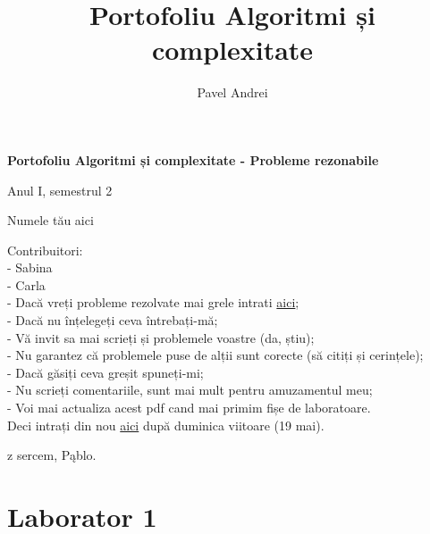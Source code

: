 \documentclass[11pt]{article}
\author{Pavel Andrei}
\date{}
\title{Portofoliu Algoritmi și complexitate}
\begin{document}
\begin{titlepage}
    \begin{center}
        \vspace*{3cm}
 
 
        \Huge
        \textbf{Portofoliu Algoritmi și complexitate - Probleme rezonabile}

        \vspace{0.5cm}
        \LARGE
        Anul I, semestrul 2

        \vspace{2cm}
        \Large
        {Numele tău aici}\\
        \vspace{2cm}
 
 
    \end{center}
    \Large
        Contribuitori:\\
        - Sabina \\
        - Carla \\
        

        \vspace{2cm}
        \Large
        \noindent
        - Dacă vreți probleme rezolvate mai grele intrati \href{https://github.com/azbyn/fundamentele/blob/master/portofoliu.pdf}{aici};\\
        - Dacă nu înțelegeți ceva întrebați-mă;\\
        - Vă invit sa mai scrieți și problemele voastre (da, știu);\\
        - Nu garantez că problemele puse de alții sunt corecte (să citiți și cerințele);\\
        - Dacă găsiți ceva greșit spuneți-mi;\\
        - Nu scrieți comentariile, sunt mai mult pentru amuzamentul meu;\\
        - Voi mai actualiza acest pdf cand mai primim fișe de laboratoare.\\ Deci intrați din nou \href{https://github.com/azbyn/fundamentele/blob/master/portofoliu_simple.pdf}{aici} după duminica viitoare (19 mai).
    
    \begin{center}
        \vfill
        z sercem, Pąblo.
    \end{center}
 
\end{titlepage}


\section*{Laborator 1}
\label{sec:orgfd967d1}
\end{document}
